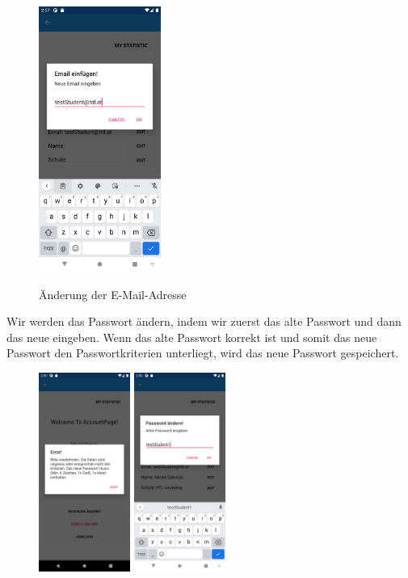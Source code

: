 \begin{figure}[h]
    \begin{center}
    \includegraphics[width=4cm]{pics/Xamarin Student/26 New Email.png}\
    \caption[MyAccount]{Änderung der E-Mail-Adresse}
    \end{center}
\end{figure}
\newpage
Wir werden das Passwort ändern, indem wir zuerst das alte Passwort und dann das neue eingeben. Wenn das alte Passwort korrekt ist und somit das neue Passwort den Passwortkriterien unterliegt, wird das neue Passwort gespeichert.
\begin{figure}[h]
    \begin{center}
    \includegraphics[width=3cm]{pics/Xamarin Student/19 Pass change.png}\hfill
    \includegraphics[width=3cm]{pics/Xamarin Student/20.png}
    \end{center}
\end{figure}
